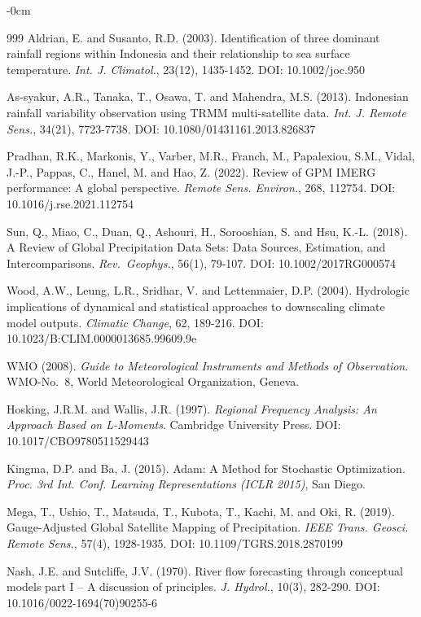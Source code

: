 \documentclass[remotesensing,article,submit,pdftex,moreauthors]{Definitions/mdpi}
\begin{document}
\begin{adjustwidth}{-\extralength}{0cm}
\begin{thebibliography}{999}
 Aldrian, E. and Susanto, R.D. (2003). Identification of three
dominant rainfall regions within Indonesia and their relationship to sea
surface temperature. \emph{Int. J. Climatol.}, 23(12), 1435-1452. DOI:
10.1002/joc.950

 As-syakur, A.R., Tanaka, T., Osawa, T. and Mahendra, M.S.
(2013). Indonesian rainfall variability observation using TRMM
multi-satellite data. \emph{Int. J. Remote Sens.}, 34(21), 7723-7738.
DOI: 10.1080/01431161.2013.826837

 Pradhan, R.K., Markonis, Y., Varber, M.R., Franch, M.,
Papalexiou, S.M., Vidal, J.-P., Pappas, C., Hanel, M. and Hao, Z.
(2022). Review of GPM IMERG performance: A global perspective.
\emph{Remote Sens. Environ.}, 268, 112754. DOI:
10.1016/j.rse.2021.112754

 Sun, Q., Miao, C., Duan, Q., Ashouri, H., Sorooshian, S. and
Hsu, K.-L. (2018). A Review of Global Precipitation Data Sets: Data
Sources, Estimation, and Intercomparisons. \emph{Rev.~Geophys.}, 56(1),
79-107. DOI: 10.1002/2017RG000574

 Wood, A.W., Leung, L.R., Sridhar, V. and Lettenmaier, D.P.
(2004). Hydrologic implications of dynamical and statistical approaches
to downscaling climate model outputs. \emph{Climatic Change}, 62,
189-216. DOI: 10.1023/B:CLIM.0000013685.99609.9e

 WMO (2008). \emph{Guide to Meteorological Instruments and
Methods of Observation}. WMO-No.~8, World Meteorological Organization,
Geneva.

 Hosking, J.R.M. and Wallis, J.R. (1997). \emph{Regional
Frequency Analysis: An Approach Based on L-Moments}. Cambridge
University Press. DOI: 10.1017/CBO9780511529443

 Kingma, D.P. and Ba, J. (2015). Adam: A Method for Stochastic
Optimization. \emph{Proc. 3rd Int. Conf. Learning Representations (ICLR
2015)}, San Diego.

 Mega, T., Ushio, T., Matsuda, T., Kubota, T., Kachi, M. and
Oki, R. (2019). Gauge-Adjusted Global Satellite Mapping of
Precipitation. \emph{IEEE Trans. Geosci. Remote Sens.}, 57(4),
1928-1935. DOI: 10.1109/TGRS.2018.2870199

 Nash, J.E. and Sutcliffe, J.V. (1970). River flow forecasting
through conceptual models part I -- A discussion of principles. \emph{J.
Hydrol.}, 10(3), 282-290. DOI: 10.1016/0022-1694(70)90255-6


\end{thebibliography}
\end{adjustwidth}
\end{document}
